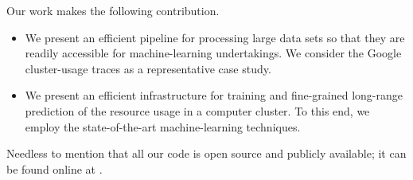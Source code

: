 Our work makes the following contribution.
\begin{itemize}
\item We present an efficient pipeline for processing large data sets so that
they are readily accessible for machine-learning undertakings. We consider the
Google cluster-usage traces \cite{reiss2011} as a representative case study.

\item We present an efficient infrastructure for training and fine-grained
long-range prediction of the resource usage in a computer cluster. To this end,
we employ the state-of-the-art machine-learning techniques.
\end{itemize}
Needless to mention that all our code is open source and publicly available; it
can be found online at \cite{sources}.

